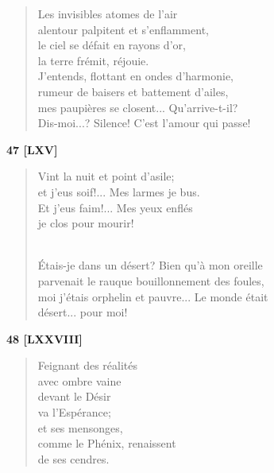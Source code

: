 \documentclass[a4paper,11pt]{book}
\begin{document}
\begin{verse}
Les invisibles atomes de l'air \\
alentour palpitent et s'enflamment, \\
le ciel se défait en rayons d'or, \\
la terre frémit, réjouie. \\
J'entends, flottant en ondes d'harmonie, \\
rumeur de baisers et battement d'ailes, \\
mes paupières se closent... Qu'arrive-t-il? \\
Dis-moi...? Silence! C'est l'amour qui passe! \\
\end{verse}

\bigskip

\begin{center} {\bf 47 [LXV]} \end{center}

\begin{verse}
Vint la nuit et point d'asile; \\
et j'eus soif!... Mes larmes je bus. \\
Et j'eus faim!... Mes yeux enflés \\
je clos pour mourir! \\ \

Étais-je dans un désert? Bien qu'à mon oreille \\
parvenait le rauque bouillonnement des foules, \\
moi j'étais orphelin et pauvre... Le monde était \\
désert... pour moi! \\
\end{verse}

\bigskip

\begin{center} {\bf 48 [LXXVIII]} \end{center}

\begin{verse}
Feignant des réalités \\
avec ombre vaine \\
devant le Désir \\
va l'Espérance; \\
et ses mensonges, \\
comme le Phénix, renaissent \\
de ses cendres. \\
\end{verse}
\end{document}

